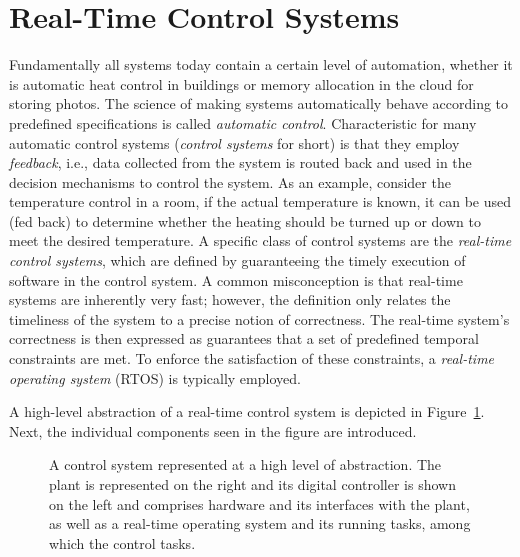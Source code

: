 \section{Real-Time Control Systems}%
\label{sec:intro:rts}%
%
Fundamentally all systems today contain a certain level of automation, whether it is automatic heat control in buildings or memory allocation in the cloud for storing photos.
The science of making systems automatically behave according to predefined specifications is called \emph{automatic control}.
Characteristic for many automatic control systems (\emph{control systems} for short) is that they employ \emph{feedback}, i.e., data collected from the system is routed back and used in the decision mechanisms to control the system.
As an example, consider the temperature control in a room, if the actual temperature is known, it can be used (fed back) to determine whether the heating should be turned up or down to meet the desired temperature.
A specific class of control systems are the \emph{real-time control systems}, which are defined by guaranteeing the timely execution of software in the control system.
A common misconception is that real-time systems are inherently very fast; however, the definition only relates the timeliness of the system to a precise notion of correctness.
The real-time system's correctness is then expressed as guarantees that a set of predefined temporal constraints are met.
To enforce the satisfaction of these constraints, a \emph{real-time operating system} (RTOS) is typically employed.

A high-level abstraction of a real-time control system is depicted in Figure~\ref{fig:high-level-abstraction}.
Next, the individual components seen in the figure are introduced. 
%
\begin{figure}[t]
    \centering
    \caption{A control system represented at a high level of abstraction. The plant is represented on the right and its digital controller is shown on the left and comprises hardware and its interfaces with the plant, as well as a real-time operating system and its running tasks, among which the control tasks.}%
    \label{fig:high-level-abstraction}%
\end{figure}

